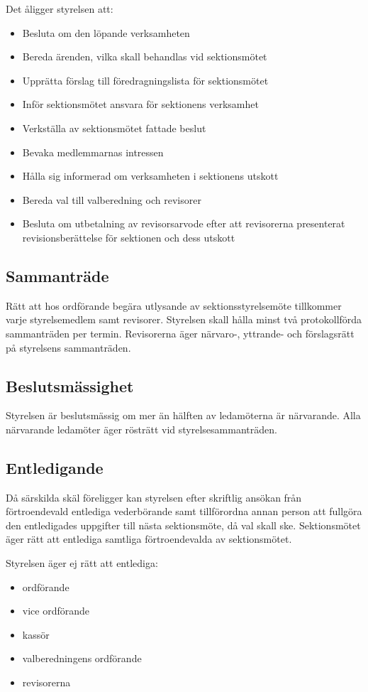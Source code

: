 \documentclass{datateknologsektionen-document}
\begin{document}
Det åligger styrelsen att:
\begin{itemize}
  \item Besluta om den löpande verksamheten
  \item Bereda ärenden, vilka skall behandlas vid sektionsmötet
  \item Upprätta förslag till föredragningslista för sektionsmötet
  \item Inför sektionsmötet ansvara för sektionens verksamhet
  \item Verkställa av sektionsmötet fattade beslut
  \item Bevaka medlemmarnas intressen
  \item Hålla sig informerad om verksamheten i sektionens utskott
  \item Bereda val till valberedning och revisorer
  \item Besluta om utbetalning av revisorsarvode efter att revisorerna presenterat
        revisionsberättelse för sektionen och dess utskott
\end{itemize}

\subsection{Sammanträde}
\label{sektionsstyrelsensammantrade}
Rätt att hos ordförande begära utlysande av sektionsstyrelsemöte tillkommer varje
styrelsemedlem samt revisorer. Styrelsen skall hålla minst två protokollförda sammanträden per termin.
Revisorerna äger närvaro-, yttrande- och förslagsrätt på styrelsens sammanträden.

\subsection{Beslutsmässighet}
Styrelsen är beslutsmässig om mer än hälften av ledamöterna är närvarande. Alla
närvarande ledamöter äger rösträtt vid styrelsesammanträden.

\subsection{Entledigande}
Då särskilda skäl föreligger kan styrelsen efter skriftlig ansökan från förtroendevald
entlediga vederbörande samt tillförordna annan person att fullgöra den entledigades
uppgifter till nästa sektionsmöte, då val skall ske. Sektionsmötet äger rätt att entlediga
samtliga förtroendevalda av sektionsmötet.

Styrelsen äger ej rätt att entlediga:
\begin{itemize}
  \item ordförande
  \item vice ordförande
  \item kassör
  \item valberedningens ordförande
  \item revisorerna
\end{itemize}
\end{document}

